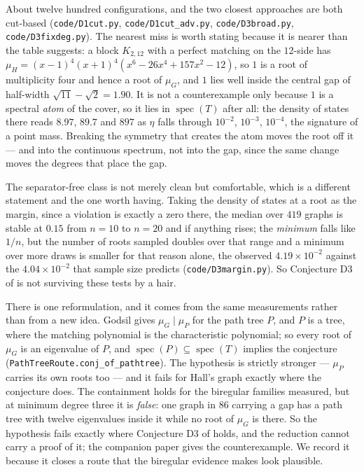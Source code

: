\documentclass[11pt]{article}
\theoremstyle{remark}
\begin{document}
About twelve hundred configurations, and the two closest approaches are both cut-based
(\texttt{code/D1cut.py}, \texttt{code/D1cut\_adv.py}, \texttt{code/D3broad.py},
\texttt{code/D3fixdeg.py}). The nearest miss is worth stating because it is nearer than the table
suggests: a block $K_{2,12}$ with a perfect matching on the $12$-side has
$\mu_H=(x-1)^4(x+1)^4(x^6-26x^4+157x^2-12)$, so $1$ is a root of multiplicity four and hence a
root of $\mu_G$, and $1$ lies well inside the central gap of half-width $\sqrt{11}-\sqrt2=1.90$.
It is not a counterexample only because $1$ is a spectral \emph{atom} of the cover, so it lies in
$\operatorname{spec}(T)$ after all: the density of states there reads $8.97$, $89.7$ and $897$ as
$\eta$ falls through $10^{-2}$, $10^{-3}$, $10^{-4}$, the signature of a point mass. Breaking the
symmetry that creates the atom moves the root off it --- and into the continuous spectrum, not
into the gap, since the same change moves the degrees that place the gap.

The separator-free class is not merely clean but comfortable, which is a different statement and
the one worth having. Taking the density of states at a root as the margin, since a violation is
exactly a zero there, the median over $419$ graphs is stable at $0.15$ from $n=10$ to $n=20$ and
if anything rises; the \emph{minimum} falls like $1/n$, but the number of roots sampled doubles
over that range and a minimum over more draws is smaller for that reason alone, the observed
$4.19\times10^{-2}$ against the $4.04\times10^{-2}$ that sample size predicts
(\texttt{code/D3margin.py}). So Conjecture D3 of \cite{PartI} is not surviving these tests by a
hair.

There is one reformulation, and it comes from the same measurements rather than from a new idea.
Godsil gives $\mu_G\mid\mu_P$ for the path tree $P$, and $P$ is a tree, where the matching
polynomial is the characteristic polynomial; so every root of $\mu_G$ is an eigenvalue of $P$, and
$\operatorname{spec}(P)\subseteq\operatorname{spec}(T)$ implies the conjecture
(\texttt{PathTreeRoute.conj\_of\_pathtree}). The hypothesis is strictly stronger --- $\mu_P$
carries its own roots too --- and it fails for Hall's graph exactly where the conjecture does. The
containment holds for the biregular families measured, but at minimum degree three it is
\emph{false}: one graph in $86$ carrying a gap has a path tree with twelve eigenvalues inside it
while no root of $\mu_G$ is there. So the hypothesis fails exactly where
Conjecture D3 of \cite{PartI} holds, and the reduction cannot carry a proof of it; the companion
paper \cite{PartII} gives the counterexample. We record it because it closes a route that the
biregular evidence makes look plausible.
\end{document}
